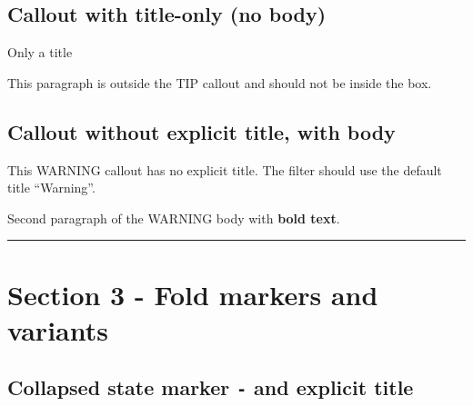 \begin{tcolorbox}[breakable,colback=ocGryBack,colframe=ocGryFrame,coltitle=ocGryTitle,left=3mm,boxed title style={left=1mm},title={\hspace*{-2.5mm}\iconInfo\; md2pdf - inner with explicit \texttt{shift-heading=0}}]
\subsection*{Callout with title-only (no
body)}\label{inner-3-callout-with-title-only-no-body}

\vspace{2mm}

\noindent\begin{tcolorbox}[colback=ocYelBack,colframe=ocYelFrame,coltitle=ocYelTitle,left=3mm,width=\linewidth,boxrule=0pt]

\hspace*{-2.5mm}\iconHint\; Only a title

\end{tcolorbox}

This paragraph is outside the TIP callout and should not be inside the
box.

\subsection*{Callout without explicit title, with
body}\label{inner-3-callout-without-explicit-title-with-body}

\begin{tcolorbox}[breakable,colback=ocOrgBack,colframe=ocOrgFrame,coltitle=ocOrgTitle,left=3mm,boxed title style={left=1mm},title={\hspace*{-2.5mm}\iconWarning\; Warning}]

This WARNING callout has no explicit title. The filter should use the
default title ``Warning''.

Second paragraph of the WARNING body with \textbf{bold text}.

\end{tcolorbox}

\begin{center}\rule{0.5\linewidth}{0.5pt}\end{center}

\section*{Section 3 - Fold markers and
variants}\label{inner-3-section-3---fold-markers-and-variants}

\subsection*{\texorpdfstring{Collapsed state marker \texttt{-} and
explicit
title}{Collapsed state marker - and explicit title}}\label{inner-3-collapsed-state-marker---and-explicit-title}


\end{tcolorbox}
